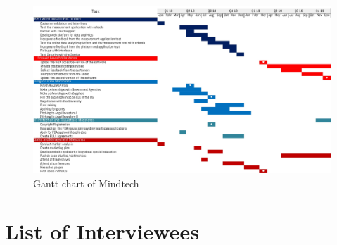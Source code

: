 \documentclass[letterpaper,10pt]{article}
\let\oldsection\section
\renewcommand{\section}{\def\cursectioning{section}\oldsection}
\begin{document}
\begin{appendices}
\begin{landscape}
\begin{figure}[!htb]
\centering
\includegraphics[scale=0.4]{gantt.jpg}
\caption{Gantt chart of Mindtech}
\end{figure}
\end{landscape}

\section{List of Interviewees}
\label{appendix:interviews}



\end{appendices}
\end{document}
